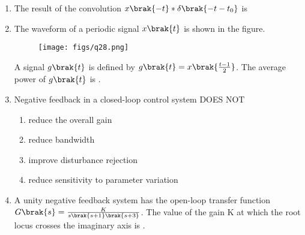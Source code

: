 \documentclass[a4paper, 11pt]{article}
\begin{document}
\begin{enumerate}
    \hfill{}

    \item The result of the convolution $x\brak{-t}*\delta\brak{-t-t_{0}}$ is
    \begin{enumerate}
    \end{enumerate}
    
    \hfill{}

    \item The waveform of a periodic signal $x\brak{t}$ is shown in the figure.
    \begin{figure}[H]
        \centering
        \texttt{[image: figs/q28.png]}
        \caption*{}
        \label{fig:q28}
    \end{figure}
    A signal $g\brak{t}$ is defined by $g\brak{t}=x\brak{\frac{t-1}{2}}$. The average power of $g\brak{t}$ is \underline{\hspace{2cm}}.
    
    \hfill{}

    \item Negative feedback in a closed-loop control system DOES NOT
    \begin{enumerate}
        \item reduce the overall gain
        \item reduce bandwidth
        \item improve disturbance rejection
        \item reduce sensitivity to parameter variation
    \end{enumerate}
    
    \hfill{}

    \item A unity negative feedback system has the open-loop transfer function $G\brak{s}=\frac{K}{s\brak{s+1}\brak{s+3}}$. The value of the gain K  at which the root locus crosses the imaginary axis is \underline{\hspace{2cm}}.
    
    \hfill{}


\end{enumerate}
\end{document}
